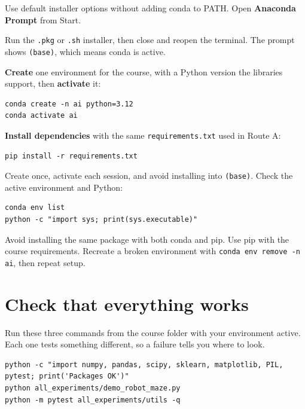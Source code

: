 \begin{description}[leftmargin=1.15in,style=nextline]
  \item[Windows] Use default installer options without adding conda to PATH. Open \textbf{Anaconda Prompt} from Start.
  \item[macOS / Linux] Run the \texttt{.pkg} or \texttt{.sh} installer, then close and reopen the terminal. The prompt shows \texttt{(base)}, which means conda is active.
\end{description}

\textbf{Create} one environment for the course, with a Python version the libraries support, then \textbf{activate} it:

\begin{lstlisting}[style=utpterminal]
conda create -n ai python=3.12
conda activate ai
\end{lstlisting}

\textbf{Install dependencies} with the same \texttt{requirements.txt} used in Route A:

\begin{lstlisting}[style=utpterminal]
pip install -r requirements.txt
\end{lstlisting}

Create once, activate each session, and avoid installing into \texttt{(base)}. Check the active environment and Python:

\begin{lstlisting}[style=utpterminal]
conda env list
python -c "import sys; print(sys.executable)"
\end{lstlisting}

\begin{pitfall}
Avoid installing the same package with both conda and pip. Use pip with the course requirements. Recreate a broken environment with \texttt{conda env remove -n ai}, then repeat setup.
\end{pitfall}

\section{Check that everything works}

Run these three commands from the course folder with your environment active. Each one tests something different, so a failure tells you where to look.

\begin{lstlisting}[style=utpterminal]
python -c "import numpy, pandas, scipy, sklearn, matplotlib, PIL, pytest; print('Packages OK')"
python all_experiments/demo_robot_maze.py
python -m pytest all_experiments/utils -q
\end{lstlisting}

